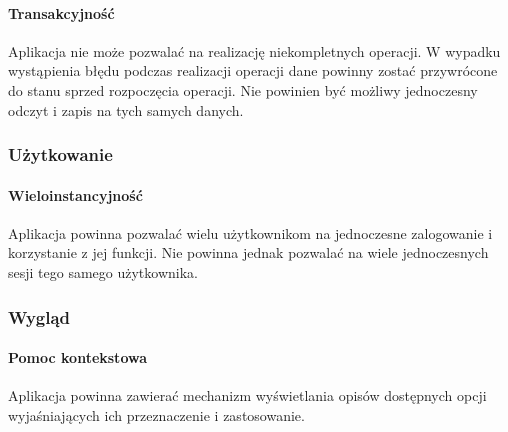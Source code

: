 \paragraph{Transakcyjność\newline}
Aplikacja nie może pozwalać na realizację niekompletnych operacji. W wypadku wystąpienia błędu podczas realizacji operacji dane powinny zostać przywrócone do stanu sprzed rozpoczęcia operacji. Nie powinien być możliwy jednoczesny odczyt i zapis na tych samych danych.

\subsubsection{Użytkowanie}

\paragraph{Wieloinstancyjność\newline}
Aplikacja powinna pozwalać wielu użytkownikom na jednoczesne zalogowanie i korzystanie z jej funkcji. Nie powinna jednak pozwalać na wiele jednoczesnych sesji tego samego użytkownika.

\subsubsection{Wygląd}

\paragraph{Pomoc kontekstowa\newline}
Aplikacja powinna zawierać mechanizm wyświetlania opisów dostępnych opcji wyjaśniających ich przeznaczenie i zastosowanie.

